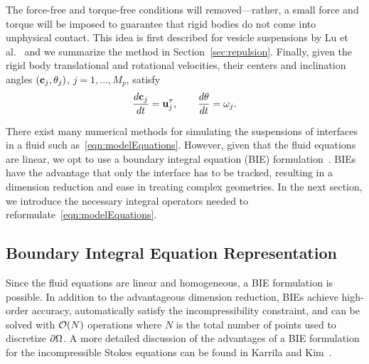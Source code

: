 \documentclass[preprint, 10pt]{elsarticle}
\begin{document}
The force-free and torque-free conditions will removed---rather, a small
force and torque will be imposed to guarantee that rigid bodies do not
come into unphysical contact.  This idea is first described for vesicle
suspensions by Lu et al.~\cite{Lu2017} and we summarize the method in
Section~\ref{sec:repulsion}.  Finally, given the rigid body
translational and rotational velocities, their centers and
inclination angles $({\mathbf{c}}_j,\theta_j)$, $j=1,\ldots,M_p$, satisfy
\begin{align*}
  \frac{d{\mathbf{c}}_j}{dt} = {\mathbf{u}}^\tau_j, \qquad 
  \frac{d\theta}{dt} = \omega_j.
\end{align*}

There exist many numerical methods for simulating the suspensions of
interfaces in a fluid such as~\eqref{eqn:modelEquations}.  However,
given that the fluid equations are linear, we opt to use a boundary
integral equation (BIE) formulation~\cite{Pozrikidis1992}.  BIEs have
the advantage that only the interface has to be tracked, resulting in a
dimension reduction and ease in treating complex geometries.  In the
next section, we introduce the necessary integral operators needed to
reformulate~\eqref{eqn:modelEquations}.

\subsection{Boundary Integral Equation Representation}
Since the fluid equations are linear and homogeneous, a BIE formulation
is possible.  In addition to the advantageous dimension reduction, BIEs
achieve high-order accuracy, automatically satisfy the incompressibility
constraint, and can be solved with ${\mathcal{O}}(N)$ operations where $N$ is
the total number of points used to discretize ${\partial}\Omega$.  A more
detailed discussion of the advantages of a BIE formulation for the
incompressible Stokes equations can be found in Karrila and
Kim~\cite{Karrila1989}.
\end{document}

